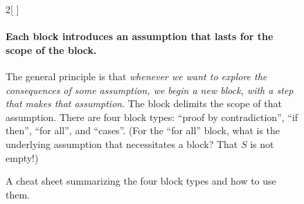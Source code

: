 \begin{figure}
\begin{multicols}{2}[
      ]
    \vspace*{2pt}
    
  \end{multicols}

  \paragraph{Each block introduces an assumption that lasts for the scope of the block.}
  The general principle is that
  \emph{whenever we want to explore the consequences of some assumption,
    we begin a new block, with a step that makes that assumption}.
  The block delimits the scope of that assumption.
  There are four block types:
  ``proof by contradiction'',  ``if then'',  ``for all'',  and ``cases''.
  (For the ``for all'' block, what is the underlying assumption that necessitates a block?
  That $S$ is not empty!)
\caption{A cheat sheet summarizing the four block types and how to use them.}\label{proofs: fig: cheat sheet}
\end{figure}

